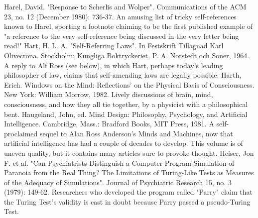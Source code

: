 Harel, David. "Response to Scherlis and Wolper". Communications of the ACM 23, no. 12
 (December 1980): 736-37. An amusing list of tricky self-references known to Harel,
 sporting a footnote claiming to be the first published example of "a reference to the very
 self-reference being discussed in the very letter being read!"
Hart, H. L. A. "Self-Referring Laws". In Festskrift Tillagnad Karl Olivecrona. Stockholm:
 Kungliga Boktryckeriet, P. A. Norstedt och Soner, 1964. A reply to Alf Ross (see below), in
 which Hart, perhaps today's leading philosopher of law, claims that self-amending laws are
 legally possible.
Harth, Erich. Windows on the Mind: Reflections' on the Physical Basis of Consciousness.
 New York: William Morrow, 1982. Lively discussions of brain, mind, consciousness, and
 how they all tie together, by a physicist with a philosophical bent.
Haugeland, John, ed. Mind Design: Philosophy, Psychology, and Artificial Intelligence.
 Cambridge, Mass.: Bradford Books, MIT Press, 1981. A self-proclaimed sequel to Alan
 Ross Anderson's Minds and Machines, now that artificial intelligence has had a couple of
 decades to develop. This volume is of uneven quality, but it contains many articles sure to
 provoke thought.
Heiser, Jon F. et al. "Can Psychiatrists Distinguish a Computer Program Simulation of
 Paranoia from the Real Thing? The Limitations of Turing-Like Tests as Measures of the
 Adequacy of Simulations". Journal of Psychiatric Research 15, no. 3 (1979): 149-62.
 Researchers who developed the program called "Parry" claim that the Turing Test's validity
 is cast in doubt because Parry passed a pseudo-Turing Test.


